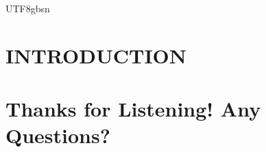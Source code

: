 \documentclass[handout, aspectratio = 1610]{beamer}
\begin{document}
\begin{CJK*}{UTF8}{gbsn}
\maketitle
\end{CJK*}

\section{INTRODUCTION}

\nocite{*}
\printbibliography

\section{Thanks for Listening! Any Questions?}
\end{document}
